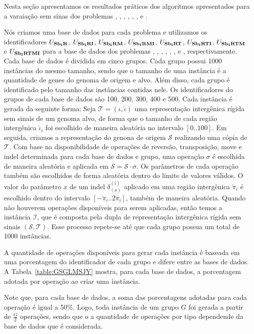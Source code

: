 Nesta seção apresentamos os resultados práticos dos algoritmos apresentados para a varaiação sem sinas dos problemas \SbIR{}, \SbIRI{}, \SbIRM{}, \SbIRMI{}, \SbIRT{}, \SbIRTI{}, \SbIRTM{} e \SbIRTMI{}.

Nós criamos uma base de dados para cada problema e utilizamos os identificadores $U_{\textbf{Sb\textsubscript{I}R}}{}$, $U_{\textbf{Sb\textsubscript{I}RI}}{}$, $U_{\textbf{Sb\textsubscript{I}RM}}{}$, $U_{\textbf{Sb\textsubscript{I}RMI}}{}$, $U_{\textbf{Sb\textsubscript{I}RT}}{}$, $U_{\textbf{Sb\textsubscript{I}RTI}}{}$, $U_{\textbf{Sb\textsubscript{I}RTM}}{}$ e $U_{\textbf{Sb\textsubscript{I}RTMI}}{}$ para a base de dados dos problemas \SbIR{}, \SbIRI{}, \SbIRM{}, \SbIRMI{}, \SbIRT{}, \SbIRTI{}, \SbIRTM{} e \SbIRTMI{}, respectivamente. Cada base de dados é dividida em cinco grupos. Cada grupo possui 1000 instâncias do mesmo tamanho, sendo que o tamanho de uma instância é a quantidade de genes do genoma de origem e alvo. Além disso, cada grupo é identificado pelo tamanho das instâncias contidas nele. Os identificadores do grupos de cada base de dados são 100, 200, 300, 400 e 500. Cada instância é gerada da seguinte forma: Seja $\mathcal{T} = (\iota,\breve\iota)$ uma representação intergênica rígida sem sinais de um genoma alvo, de forma que o tamanho de cada região intergênica $\breve\iota_i$ foi escolhido de maneira aleatória no intervalo $[0..100]$. Em seguida, criamos a representação do genona de origem $\mathcal{S}$ realizando uma cópia de $\mathcal{T}$. Com base na disponibilidade de operações de reversão, transposição, move e indel determinada para cada base de dados e grupo, uma operação $\sigma$ é escolhida de maneira aleatória e aplicada em $\mathcal{S} = \mathcal{S} \cdot \sigma$. Os parâmetros de cada operação também são escolhidos de forma aleatória dentro do limite de valores válidos. O valor do parâmetro $x$ de um indel $\delta^{(i)}_{(x)}$ aplicado em uma região intergênica $\breve\pi_{i}$ é escolhido dentro do intervalo $[-\breve\pi_{i}..2\breve\pi_{i}]$, também de maneira aleatória. Quando não houverem operações disponíveis para serem aplicadas, então temos a instância $\mathcal{I}$, que é composta pela dupla de representação intergênica rígida sem sinais $(\mathcal{S},\mathcal{T})$. Esse processo repete-se até que cada grupo possua um total de 1000 instâncias. 

A quantidade de operações disponíveis para gerar cada instância é baseada em uma porcentagem do identificador de cada grupo e difere entre as bases de dados. A Tabela~\ref{table:GSGLMSJY} mostra, para cada base de dados, a porcentagem adotada por operação ao criar uma instância.



Note que, para cada base de dados, a soma das porcentagens adotadas para cada operação é igual a 50\%. Logo, toda instância de um grupo $G$ foi gerada a partir de $\frac{G}{2}$ operações, sendo que o a quantidade de operações por tipo dependende da base de dados que é considerada.   

